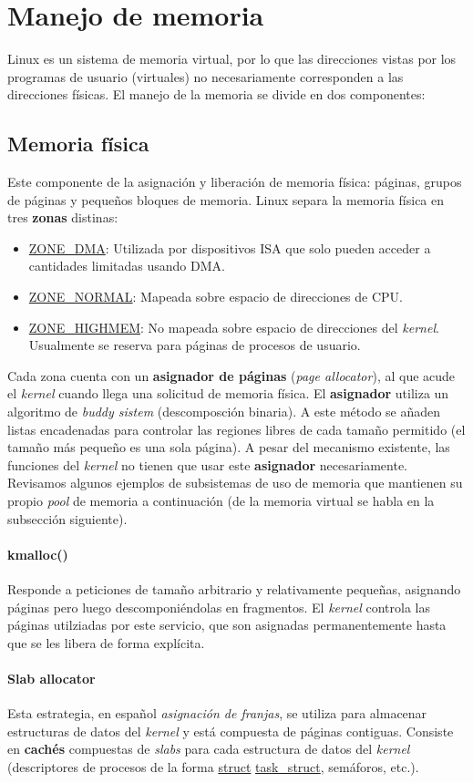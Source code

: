 \documentclass[spanish]{article}
\begin{document}
\section{Manejo de memoria}
Linux es un sistema de memoria virtual, por lo que las direcciones vistas por los programas de usuario (virtuales) no necesariamente corresponden a las direcciones físicas\cite{linuxDevices13}. El manejo de la memoria se divide en dos componentes:
\subsection{Memoria física}
Este componente de la asignación y liberación de memoria física: páginas, grupos de páginas y pequeños bloques de memoria. Linux separa la memoria física en tres \textbf{zonas} distinas:
\begin{itemize}
	\item \url{ZONE_DMA}: Utilizada por dispositivos ISA que solo pueden acceder a cantidades limitadas usando DMA.
	\item \url{ZONE_NORMAL}: Mapeada sobre espacio de direcciones de CPU.
	\item \url{ZONE_HIGHMEM}: No mapeada sobre espacio de direcciones del \textit{kernel}. Usualmente se reserva para páginas de procesos de usuario. 
\end{itemize}
Cada zona cuenta con un \textbf{asignador de páginas} (\textit{page allocator}), al que acude el \textit{kernel} cuando llega una solicitud de memoria física. El \textbf{asignador} utiliza un algoritmo de \textit{buddy sistem} (descomposción binaria). A este método se añaden listas encadenadas para controlar las regiones libres de cada tamaño permitido (el tamaño más pequeño es una sola página).
A pesar del mecanismo existente, las funciones del \textit{kernel} no tienen que usar este \textbf{asignador} necesariamente. Revisamos algunos ejemplos de subsistemas de uso de memoria que mantienen su propio \textit{pool} de memoria a continuación (de la memoria virtual se habla en la subsección siguiente).
\paragraph{kmalloc()}Responde a peticiones de tamaño arbitrario y relativamente pequeñas, asignando páginas pero luego descomponiéndolas en fragmentos. El \textit{kernel} controla las páginas utilziadas por este servicio, que son asignadas permanentemente hasta que se les libera de forma explícita. 
\paragraph{Slab allocator}Esta estrategia, en español \textit{asignación de franjas}, se utiliza para almacenar estructuras de datos del \textit{kernel} y está compuesta de páginas contiguas. Consiste en \textbf{cachés} compuestas de \textit{slabs} para cada estructura de datos del \textit{kernel} (descriptores de procesos de la forma \url{struct} \url{task_struct}, semáforos, etc.).
\end{document}
